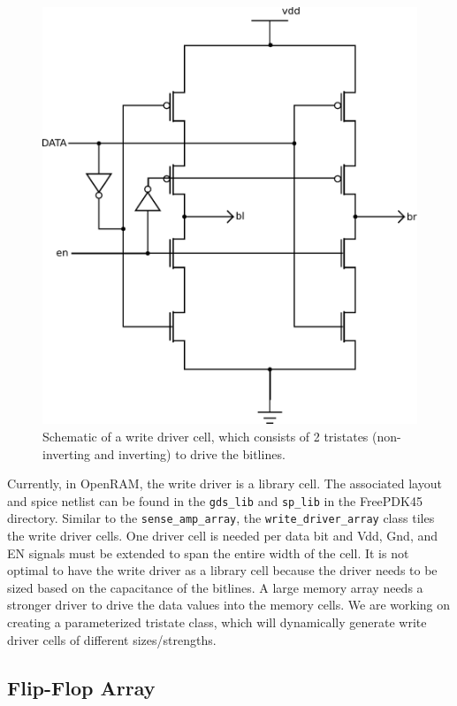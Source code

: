 \begin{figure}[h!]
\centering
\includegraphics[scale=.8]{./figs/write_driver_schem.pdf}
\caption{Schematic of a write driver cell, which consists of 2 tristates (non-inverting and inverting) to drive the bitlines.}
\label{fig:write_driver}
\end{figure}

Currently, in OpenRAM, the write driver is a library cell.  The
associated layout and spice netlist can be found in the \verb|gds_lib| and
\verb|sp_lib| in the FreePDK45 directory.  Similar to the \verb|sense_amp_array|,
the \verb|write_driver_array| class tiles the write driver cells.  One
driver cell is needed per data bit and Vdd, Gnd, and EN signals must
be extended to span the entire width of the cell. It is not optimal to
have the write driver as a library cell because the driver needs to be
sized based on the capacitance of the bitlines.  A large memory array
needs a stronger driver to drive the data values into the memory
cells.  We are working on creating a parameterized tristate class,
which will dynamically generate write driver cells of different
sizes/strengths.

\subsection{Flip-Flop Array}

